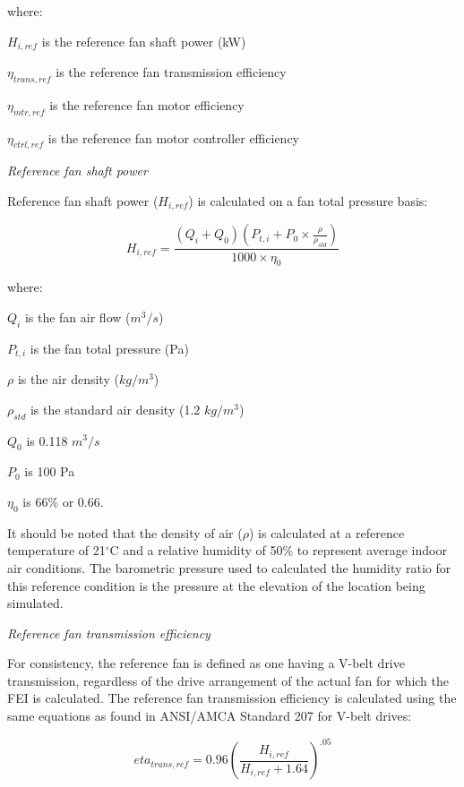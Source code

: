where:

\(H_{i,ref}\) is the reference fan shaft power (kW)

\(\eta_{trans,ref}\) is the reference fan transmission efficiency

\(\eta_{mtr,ref}\) is the reference fan motor efficiency

\(\eta_{ctrl,ref}\) is the reference fan motor controller efficiency

\emph{Reference fan shaft power}

Reference fan shaft power (\(H_{i,ref}\)) is calculated on a fan total pressure basis:

\begin{equation}
H_{i,ref}=\frac{(Q_i + Q_0)(P_{t,i} + P_0 \times \frac{\rho}{\rho_{std}} )}{1000 \times \eta_0}
\label{eq:Href_calculation}
\end{equation}

where:

\(Q_i\) is the fan air flow (\(m^3/s\))

\(P_{t,i}\) is the fan total pressure (Pa)

\(\rho\) is the air density (\(kg/m^3\))

\(\rho_{std}\) is the standard air density (1.2 \(kg/m^3\))

\(Q_0\) is 0.118 \(m^3/s\)

\(P_0\) is 100 Pa

\(\eta_0\) is 66\% or 0.66.

It should be noted that the density of air (\(\rho\)) is calculated at a reference temperature of 21\(^{\circ}\)C and a relative humidity of 50\% to represent average indoor air conditions.  The barometric pressure used to calculated the humidity ratio for this reference condition is the pressure at the elevation of the location being simulated.

\emph{Reference fan transmission efficiency}

For consistency, the reference fan is defined as one having a V-belt drive transmission, regardless of the drive arrangement of the actual fan for which the FEI is calculated. The reference fan transmission efficiency is calculated using the same equations as found in ANSI/AMCA Standard 207 for V-belt drives:

\begin{equation}
eta_{trans,ref}=0.96(\frac{H_{i,ref}}{H_{i,ref}+1.64})^{.05}
\label{eq:eta_trans_calculation}
\end{equation}

